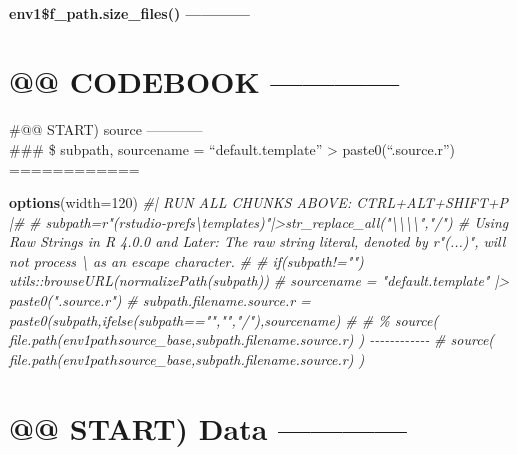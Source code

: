 \documentclass[
]{article}
\newenvironment{Shaded}{\begin{snugshade}}{\end{snugshade}}
\newcommand{\AttributeTok}[1]{\textcolor[rgb]{0.13,0.29,0.53}{#1}}
\newcommand{\CommentTok}[1]{\textcolor[rgb]{0.56,0.35,0.01}{\textit{#1}}}
\newcommand{\DecValTok}[1]{\textcolor[rgb]{0.00,0.00,0.81}{#1}}
\newcommand{\FunctionTok}[1]{\textcolor[rgb]{0.13,0.29,0.53}{\textbf{#1}}}
\newcommand{\NormalTok}[1]{#1}
\begin{document}
\hypertarget{env1f_path.size_files}{%
\paragraph{env1\$f\_path.size\_files()
------------}\label{env1f_path.size_files}}

\hypertarget{codebook}{%
\section{@@ CODEBOOK ------------}\label{codebook}}

\#@@ START) source ------------\\
\#\#\# \$ subpath, sourcename = ``default.template''
\textbar\textgreater{} paste0(``.source.r'') ============

\begin{Shaded}
\begin{Highlighting}[]
\FunctionTok{options}\NormalTok{(}\AttributeTok{width=}\DecValTok{120}\NormalTok{)}
\CommentTok{\#| RUN ALL CHUNKS ABOVE: CTRL+ALT+SHIFT+P |\#}
\CommentTok{\# subpath=r"(rstudio{-}prefs\textbackslash{}templates)"|\textgreater{}str\_replace\_all("\textbackslash{}\textbackslash{}\textbackslash{}\textbackslash{}","/")  \# Using Raw Strings in R 4.0.0 and Later: The raw string literal, denoted by r"(...)", will not process \textbackslash{} as an escape character.}
\CommentTok{\# \# if(subpath!="") utils::browseURL(normalizePath(subpath))}
\CommentTok{\# sourcename = "default.template" |\textgreater{} paste0(".source.r")}
\CommentTok{\# subpath.filename.source.r = paste0(subpath,ifelse(subpath=="","","/"),sourcename)}
\CommentTok{\# \# \% source( file.path(env1$path$source\_base,subpath.filename.source.r) ) {-}{-}{-}{-}{-}{-}{-}{-}{-}{-}{-}{-}  }
\CommentTok{\# source( file.path(env1$path$source\_base,subpath.filename.source.r) )}
\end{Highlighting}
\end{Shaded}

\hypertarget{start-data}{%
\section{@@ START) Data ------------}\label{start-data}}
\end{document}
